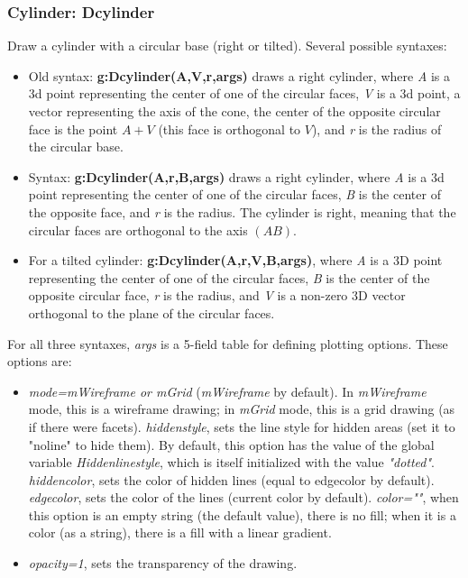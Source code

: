 \subsubsection{Cylinder: Dcylinder}

Draw a cylinder with a circular base (right or tilted). Several possible syntaxes:
\begin{itemize}
    \item Old syntax: \textbf{g:Dcylinder(A,V,r,args)} draws a right cylinder, where \emph{A} is a 3d point representing the center of one of the circular faces, \emph{V} is a 3d point, a vector representing the axis of the cone, the center of the opposite circular face is the point $A+V$ (this face is orthogonal to $V$), and \emph{r} is the radius of the circular base.
    \item Syntax: \textbf{g:Dcylinder(A,r,B,args)} draws a right cylinder, where \emph{A} is a 3d point representing the center of one of the circular faces, \emph{B} is the center of the opposite face, and \emph{r} is the radius. The cylinder is right, meaning that the circular faces are orthogonal to the axis $(AB)$.
    \item For a tilted cylinder: \textbf{g:Dcylinder(A,r,V,B,args)}, where \emph{A} is a 3D point representing the center of one of the circular faces, \emph{B} is the center of the opposite circular face, \emph{r} is the radius, and \emph{V} is a non-zero 3D vector orthogonal to the plane of the circular faces.
\end{itemize}
For all three syntaxes, \emph{args} is a 5-field table for defining plotting options. These options are:
\begin{itemize}
    \item \emph{mode=mWireframe or mGrid} (\emph{mWireframe} by default). In \emph{mWireframe} mode, this is a wireframe drawing; in \emph{mGrid} mode, this is a grid drawing (as if there were facets).
\emph{hiddenstyle}, sets the line style for hidden areas (set it to "noline" to hide them). By default, this option has the value of the global variable \emph{Hiddenlinestyle}, which is itself initialized with the value \emph{"dotted"}.
\emph{hiddencolor}, sets the color of hidden lines (equal to edgecolor by default).
\emph{edgecolor}, sets the color of the lines (current color by default).
\emph{color=""}, when this option is an empty string (the default value), there is no fill; when it is a color (as a string), there is a fill with a linear gradient.
    \item \emph{opacity=1}, sets the transparency of the drawing.
\end{itemize}


